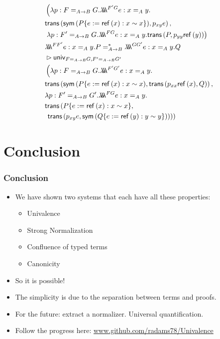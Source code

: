 \begin{align*}
& \left( \lambda p : F =_{A \rightarrow B} G .
\triplelambda^{F' G} e : x =_A y. \right. \\
& \trans{\sym{P\{e := \reff{x} : x \sim x\}}}
{p_{xy}e}, \\
& \left. \lambda p:F'=_{A \rightarrow B} G. \triplelambda^{FG} e : x =_A y.
\trans{P}{p_{yy} \reff{y}} \right) \\
\lefteqn{\triplelambda^{F F'} e : x =_A y. P =^*_{A \rightarrow B} \triplelambda^{G G'} e : x =_A y . Q} \\
& \rhd 
\mathsf{univ}_{F =_{A \rightarrow B} G,F' =_{A \rightarrow B} G'} \\
& \left( \lambda p : F =_{A \rightarrow B} G . \triplelambda^{F' G'} e : x =_A y. \right. \\
& \trans{\sym{P\{e := \reff{x} : x \sim x}}{\trans{p_{xx} \reff{x}}{Q}} , \\
& \lambda p : F' =_{A \rightarrow B} G' . \triplelambda^{FG} e : x =_A y. \\
& \mathsf{trans} \left( P \{ e := \reff{x} : x \sim x \} , \right. \\
& \left. \left. \trans{p_{xy} e}{\sym{Q \{e := \reff{y} : y \sim y \}}} \right) \right)
\end{align*}

\section{Conclusion}

\begin{frame}
\frametitle{Conclusion}
\begin{itemize}[<+->]
\item
We have shown two systems that each have all these properties:
\begin{itemize}
\item
Univalence
\item
Strong Normalization
\item
Confluence of typed terms
\item
Canonicity
\end{itemize}
\item
So it is possible!
\item
The simplicity is due to the separation between terms and proofs.
\item
For the future: extract a normalizer.  Universal quantification.
\item
Follow the progress here: \url{www.github.com/radams78/Univalence}
\end{itemize}
\end{frame}

